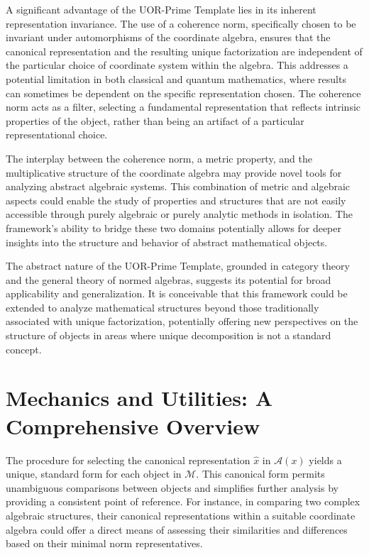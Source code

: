 \documentclass{article}
\begin{document}
A significant advantage of the UOR-Prime Template lies in its inherent representation invariance. The use of a coherence norm, specifically chosen to be invariant under automorphisms of the coordinate algebra, ensures that the canonical representation and the resulting unique factorization are independent of the particular choice of coordinate system within the algebra. This addresses a potential limitation in both classical and quantum mathematics, where results can sometimes be dependent on the specific representation chosen. The coherence norm acts as a filter, selecting a fundamental representation that reflects intrinsic properties of the object, rather than being an artifact of a particular representational choice.

The interplay between the coherence norm, a metric property, and the multiplicative structure of the coordinate algebra may provide novel tools for analyzing abstract algebraic systems. This combination of metric and algebraic aspects could enable the study of properties and structures that are not easily accessible through purely algebraic or purely analytic methods in isolation. The framework's ability to bridge these two domains potentially allows for deeper insights into the structure and behavior of abstract mathematical objects.

The abstract nature of the UOR-Prime Template, grounded in category theory and the general theory of normed algebras, suggests its potential for broad applicability and generalization. It is conceivable that this framework could be extended to analyze mathematical structures beyond those traditionally associated with unique factorization, potentially offering new perspectives on the structure of objects in areas where unique decomposition is not a standard concept.

\section{Mechanics and Utilities: A Comprehensive Overview}

The procedure for selecting the canonical representation $\hat{x}$ in $\mathcal{A}(x)$ yields a unique, standard form for each object in $\mathcal{M}$. This canonical form permits unambiguous comparisons between objects and simplifies further analysis by providing a consistent point of reference. For instance, in comparing two complex algebraic structures, their canonical representations within a suitable coordinate algebra could offer a direct means of assessing their similarities and differences based on their minimal norm representatives.
\end{document}
